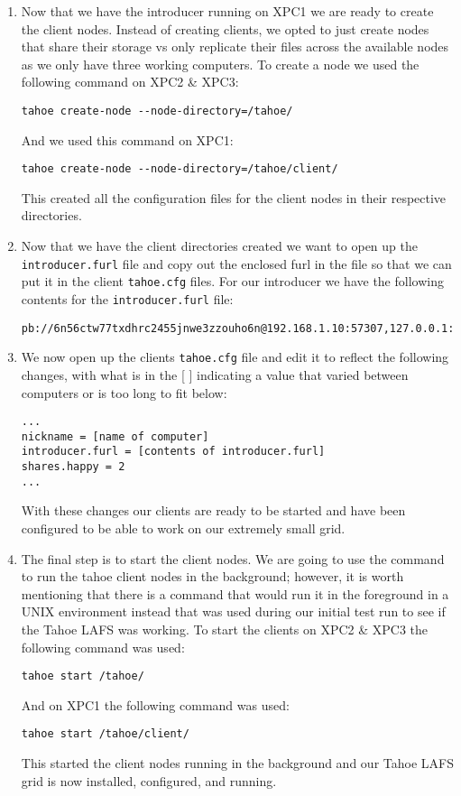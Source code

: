 \documentclass[11pt]{article}
\begin{document}
\begin{enumerate}
\item Now that we have the introducer running on XPC1 we are ready to
  create the client nodes. Instead of creating clients, we opted to
  just create nodes that share their storage vs only replicate their
  files across the available nodes as we only have three working
  computers. To create a node we used the following command on XPC2 \&
  XPC3:
\begin{verbatim}
tahoe create-node --node-directory=/tahoe/
\end{verbatim}
And we used this command on XPC1:
\begin{verbatim}
tahoe create-node --node-directory=/tahoe/client/
\end{verbatim}
This created all the configuration files for the client nodes in their
respective directories.

\item Now that we have the client directories created we want to open
  up the \texttt{introducer.furl} file and copy out the
  enclosed furl in the file so that we can put it in the client
  \texttt{tahoe.cfg} files. For our introducer we have the following contents
  for the \texttt{introducer.furl} file:
\begin{verbatim}
pb://6n56ctw77txdhrc2455jnwe3zzouho6n@192.168.1.10:57307,127.0.0.1:57307/introducer
\end{verbatim}

\item We now open up the clients \texttt{tahoe.cfg} file and edit it to reflect
  the following changes, with what is in the [ ] indicating a value
  that varied between computers or is too long to fit below:
\begin{verbatim}
...
nickname = [name of computer]
introducer.furl = [contents of introducer.furl]
shares.happy = 2
...
\end{verbatim}
With these changes our clients are ready to be started and have been
configured to be able to work on our extremely small grid.

\item The final step is to start the client nodes. We are going to use
  the command to run the tahoe client nodes in the background;
  however, it is worth mentioning that there is a command that would
  run it in the foreground in a UNIX environment instead that was used
  during our initial test run to see if the Tahoe LAFS was working. To
  start the clients on XPC2 \& XPC3 the following command was used:
\begin{verbatim}  
tahoe start /tahoe/
\end{verbatim}
And on XPC1 the following command was used:
\begin{verbatim}
tahoe start /tahoe/client/
\end{verbatim}
This started the client nodes running in the background and our Tahoe
LAFS grid is now installed, configured, and running.
\end{enumerate}
\end{document}
